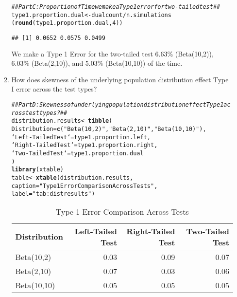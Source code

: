 \documentclass{article}\usepackage[]{graphicx}\usepackage[]{xcolor}
\makeatletter
\newcommand{\hlnum}[1]{\textcolor[rgb]{0.686,0.059,0.569}{#1}}%
\newcommand{\hlsng}[1]{\textcolor[rgb]{0.192,0.494,0.8}{#1}}%
\newcommand{\hlcom}[1]{\textcolor[rgb]{0.678,0.584,0.686}{\textit{#1}}}%
\newcommand{\hlopt}[1]{\textcolor[rgb]{0,0,0}{#1}}%
\newcommand{\hldef}[1]{\textcolor[rgb]{0.345,0.345,0.345}{#1}}%
\newcommand{\hlkwb}[1]{\textcolor[rgb]{0.69,0.353,0.396}{#1}}%
\newcommand{\hlkwc}[1]{\textcolor[rgb]{0.333,0.667,0.333}{#1}}%
\newcommand{\hlkwd}[1]{\textcolor[rgb]{0.737,0.353,0.396}{\textbf{#1}}}%
\newenvironment{kframe}{%
 \def\at@end@of@kframe{}%
 \ifinner\ifhmode%
  \def\at@end@of@kframe{\end{minipage}}%
  \begin{minipage}{\columnwidth}%
 \fi\fi%
 \def\FrameCommand##1{\hskip\@totalleftmargin \hskip-\fboxsep
 \colorbox{shadecolor}{##1}\hskip-\fboxsep
     \hskip-\linewidth \hskip-\@totalleftmargin \hskip\columnwidth}%
 \MakeFramed {\advance\hsize-\width
   \@totalleftmargin\z@ \linewidth\hsize
   \@setminipage}}%
 {\par\unskip\endMakeFramed%
 \at@end@of@kframe}
\newenvironment{knitrout}{}{} %
\makeatother
\begin{document}
\begin{enumerate}
\begin{enumerate}
\begin{knitrout}
\begin{kframe}
\begin{alltt}
\hlcom{## Part C: Proportion of Time we make a Type 1 error for two-tailed test ##}
\hldef{type1.proportion.dual} \hlkwb{<-} \hldef{dualcount}\hlopt{/}\hldef{n.simulations}
\hldef{(}\hlkwd{round}\hldef{(type1.proportion.dual,} \hlnum{4}\hldef{))}
\end{alltt}
\begin{verbatim}
## [1] 0.0652 0.0575 0.0499
\end{verbatim}
\end{kframe}
\end{knitrout}
We make a Type 1 Error for the two-tailed test 6.63\% (Beta(10,2)), 6.03\% (Beta(2,10)), and 5.03\% (Beta(10,10)) of the time.
    \item How does skewness of the underlying population distribution effect
    Type I error across the test types?
\begin{knitrout}
\color{fgcolor}\begin{kframe}
\begin{alltt}
\hlcom{## Part D: Skewness of underlying population distribution effect Type 1 across test types? ##}
\hldef{distribution.results} \hlkwb{<-} \hlkwd{tibble}\hldef{(}
  \hlkwc{Distribution} \hldef{=} \hlkwd{c}\hldef{(}\hlsng{"Beta(10,2)"}\hldef{,} \hlsng{"Beta(2,10)"}\hldef{,} \hlsng{"Beta(10,10)"}\hldef{),}
  \hlkwc{`Left-Tailed Test`} \hldef{= type1.proportion.left,}
  \hlkwc{`Right-Tailed Test`} \hldef{= type1.proportion.right,}
  \hlkwc{`Two-Tailed Test`} \hldef{= type1.proportion.dual}
\hldef{)}
\hlkwd{library}\hldef{(xtable)}
\hldef{table} \hlkwb{<-} \hlkwd{xtable}\hldef{(distribution.results,}
                \hlkwc{caption} \hldef{=} \hlsng{"Type 1 Error Comparison Across Tests"}\hldef{,}
                \hlkwc{label} \hldef{=} \hlsng{"tab:distresults"}\hldef{)}
\end{alltt}
\end{kframe}
\end{knitrout}
\begin{table}[H]
\centering
\begingroup\small
\begin{tabular}{lrrr}
  \hline
Distribution & Left-Tailed Test & Right-Tailed Test & Two-Tailed Test \\ 
  \hline
Beta(10,2) & 0.03 & 0.09 & 0.07 \\ 
  Beta(2,10) & 0.07 & 0.03 & 0.06 \\ 
  Beta(10,10) & 0.05 & 0.05 & 0.05 \\ 
   \hline
\end{tabular}
\endgroup
\caption{Type 1 Error Comparison Across Tests} 
\label{tab:distresults}
\end{table}


\end{enumerate}
\end{enumerate}
\end{document}
